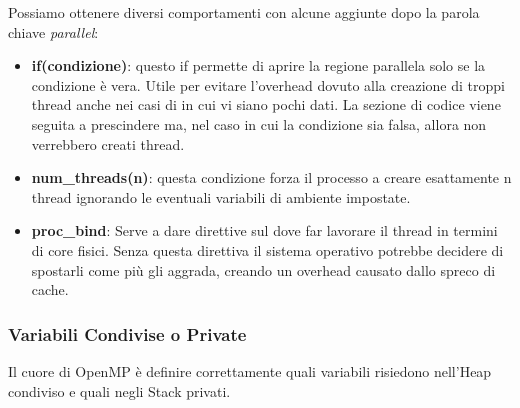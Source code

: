 Possiamo ottenere diversi comportamenti con alcune aggiunte dopo la parola chiave \textit{parallel}:
\begin{itemize}
    \item \textbf{if(condizione)}: questo if permette di aprire la regione parallela solo se la condizione è vera. Utile per evitare l'overhead dovuto alla creazione di troppi thread anche nei casi di in cui vi siano pochi dati. La sezione di codice viene seguita a prescindere ma, nel caso in cui la condizione sia falsa, allora non verrebbero creati thread.
    \item \textbf{num\_threads(n)}: questa condizione forza il processo a creare esattamente n thread ignorando le eventuali variabili di ambiente impostate.
    \item \textbf{proc\_bind}: Serve a dare direttive sul dove far lavorare il thread in termini di core fisici. Senza questa direttiva il sistema operativo potrebbe decidere di spostarli come più gli aggrada, creando un overhead causato dallo spreco di cache. 
\end{itemize}
\subsubsection*{Variabili Condivise o Private}
Il cuore di OpenMP è definire correttamente quali variabili risiedono nell'Heap condiviso e quali negli Stack privati.

